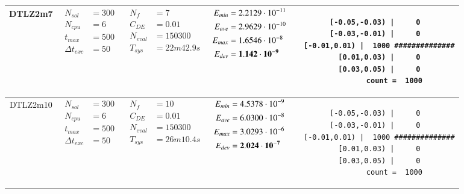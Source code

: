 \begin{table*} [!t]
\begin{tabular}[c]{ccccc}
DTLZ2m7
&
{$\!\begin{aligned}
    N_{sol}        &= 300 \\
	N_{cpu}        &= 6 \\
	t_{max}        &= 500 \\
	\Delta t_{exc} &= 50
\end{aligned}$}
&
{$\!\begin{aligned}
	N_{f}    &= 7 \\
	C_{DE}   &= 0.01 \\
	N_{eval} &= 150300 \\
	T_{sys}  &= 22m42.9s
\end{aligned}$}
&
{$\!\begin{aligned}
    E_{min} &= 2.2129\cdot 10^{-11} \\
    E_{ave} &= 2.9629\cdot 10^{-10} \\
    E_{max} &= 1.6546\cdot 10^{-8} \\
    E_{dev} &= {\bf 1.142\cdot 10^{-9}}
\end{aligned}$}
&
\begin{minipage}{4.1cm} \fontsize{5pt}{6pt}
\begin{verbatim}
 [-0.05,-0.03) |     0 
 [-0.03,-0.01) |     0 
  [-0.01,0.01) |  1000 ##############
   [0.01,0.03) |     0 
   [0.03,0.05) |     0 
         count =  1000
 \end{verbatim}
\end{minipage} \\

\hline



DTLZ2m10
&
{$\!\begin{aligned}
    N_{sol}        &= 300 \\
	N_{cpu}        &= 6 \\
	t_{max}        &= 500 \\
	\Delta t_{exc} &= 50
\end{aligned}$}
&
{$\!\begin{aligned}
	N_{f}    &= 10 \\
	C_{DE}   &= 0.01 \\
	N_{eval} &= 150300 \\
	T_{sys}  &= 26m10.4s
\end{aligned}$}
&
{$\!\begin{aligned}
    E_{min} &= 4.5378\cdot 10^{-9} \\
    E_{ave} &= 6.0300\cdot 10^{-8} \\
    E_{max} &= 3.0293\cdot 10^{-6} \\
    E_{dev} &= {\bf 2.024\cdot 10^{-7}}
\end{aligned}$}
&
\begin{minipage}{4.1cm} \fontsize{5pt}{6pt}
\begin{verbatim}
 [-0.05,-0.03) |     0 
 [-0.03,-0.01) |     0 
  [-0.01,0.01) |  1000 ##############
   [0.01,0.03) |     0 
   [0.03,0.05) |     0 
         count =  1000
 \end{verbatim}
\end{minipage} \\


\end{tabular}
\end{table*}
